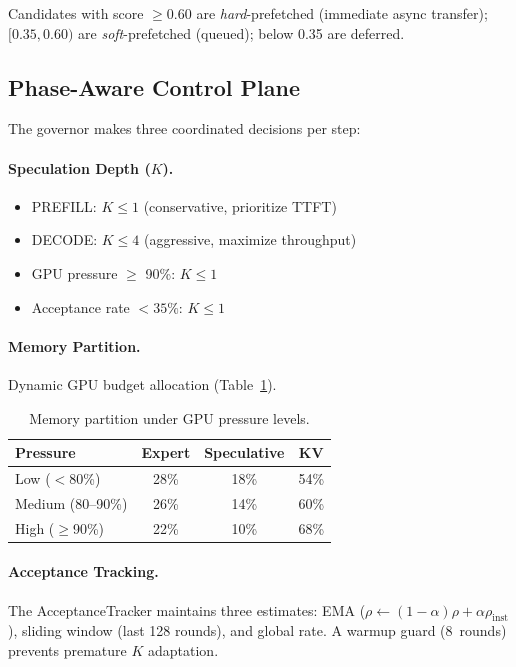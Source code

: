 \documentclass[letterpaper,twocolumn,10pt]{article}
\begin{document}
Candidates with score $\geq 0.60$ are \emph{hard}-prefetched
(immediate async transfer); $[0.35, 0.60)$ are \emph{soft}-prefetched
(queued); below 0.35 are deferred.

\subsection{Phase-Aware Control Plane}\label{sec:governor}

The governor makes three coordinated decisions per step:

\paragraph{Speculation Depth ($K$).}
\begin{itemize}[leftmargin=*,itemsep=1pt]
\item PREFILL: $K \leq 1$ (conservative, prioritize TTFT)
\item DECODE: $K \leq 4$ (aggressive, maximize throughput)
\item GPU pressure $\geq$ 90\%: $K \leq 1$
\item Acceptance rate $< 35\%$: $K \leq 1$
\end{itemize}

\paragraph{Memory Partition.}  Dynamic GPU budget allocation
(Table~\ref{tab:mempart}).

\begin{table}[t]
\centering
\small
\caption{Memory partition under GPU pressure levels.}\label{tab:mempart}
\begin{tabular}{lccc}
\toprule
\textbf{Pressure} & \textbf{Expert} & \textbf{Speculative} & \textbf{KV} \\
\midrule
Low ($<$80\%)    & 28\% & 18\% & 54\% \\
Medium (80--90\%) & 26\% & 14\% & 60\% \\
High ($\geq$90\%) & 22\% & 10\% & 68\% \\
\bottomrule
\end{tabular}
\end{table}

\paragraph{Acceptance Tracking.}  The AcceptanceTracker maintains three
estimates: EMA ($\rho \leftarrow (1\!-\!\alpha)\rho + \alpha \rho_{\text{inst}}$),
sliding window (last 128 rounds), and global rate.  A warmup guard
(8~rounds) prevents premature $K$ adaptation.
\end{document}
